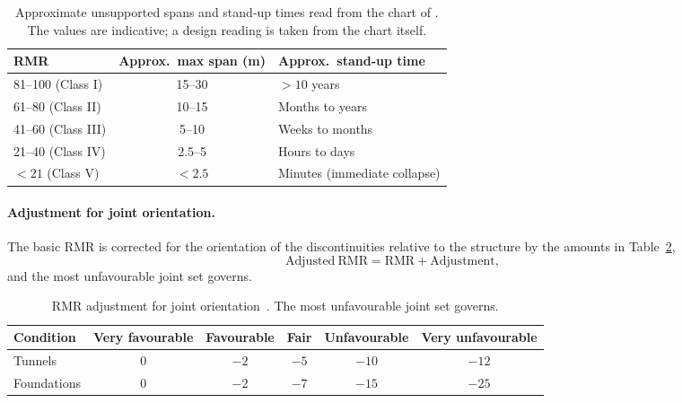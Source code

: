 \begin{table}[htbp]
\caption{Approximate unsupported spans and stand-up times read from the chart of \citet{bieniawski1989rmr}. The values are indicative; a design reading is taken from the chart itself.}
\label{tab:rmr-span-standup}
\centering
\small
\begin{tabularx}{\textwidth}{l c X}
\toprule
\textbf{RMR} & \textbf{Approx.\ max span (m)} & \textbf{Approx.\ stand-up time} \\
\midrule
81--100 (Class I) & 15--30 & $>10$ years \\
61--80 (Class II) & 10--15 & Months to years \\
41--60 (Class III) & 5--10 & Weeks to months \\
21--40 (Class IV) & 2.5--5 & Hours to days \\
$<21$ (Class V) & $<2.5$ & Minutes (immediate collapse) \\
\bottomrule
\end{tabularx}
\end{table}

\paragraph{Adjustment for joint orientation.}
The basic RMR is corrected for the orientation of the discontinuities
relative to the structure by the amounts in
Table~\ref{tab:rmr-orientation-adjustment},
\[
\mathrm{Adjusted\ RMR} = \mathrm{RMR} + \mathrm{Adjustment} ,
\]
and the most unfavourable joint set governs.

\begin{table}[htbp]
\caption{RMR adjustment for joint orientation~\citep{bieniawski1989rmr}. The most unfavourable joint set governs.}
\label{tab:rmr-orientation-adjustment}
\centering
\small
\begin{tabular}{lccccc}
\toprule
\textbf{Condition} & \textbf{Very favourable} & \textbf{Favourable} & \textbf{Fair} & \textbf{Unfavourable} & \textbf{Very unfavourable} \\
\midrule
Tunnels & 0 & $-2$ & $-5$ & $-10$ & $-12$ \\
Foundations & 0 & $-2$ & $-7$ & $-15$ & $-25$ \\
\bottomrule
\end{tabular}
\end{table}


